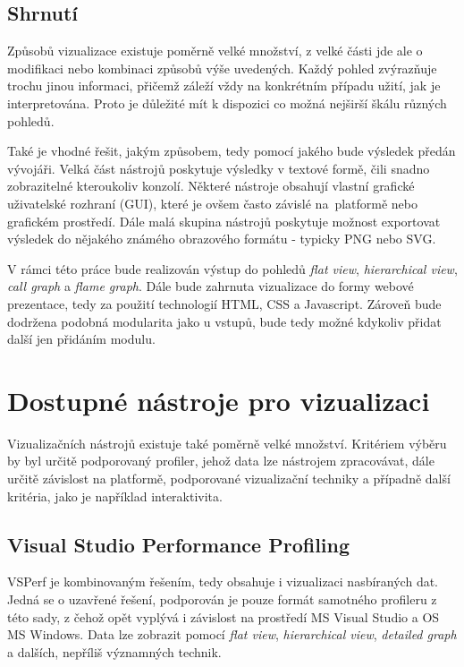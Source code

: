 \documentclass[czech,BP]{thesiskiv}
\begin{document}
\section{Shrnutí}

Způsobů vizualizace existuje poměrně velké množství, z velké části jde ale o modifikaci nebo kombinaci způsobů výše uvedených. Každý pohled zvýrazňuje trochu jinou informaci, přičemž záleží vždy na konkrétním případu užití, jak je interpretována. Proto je důležité mít k dispozici co možná nejširší škálu různých pohledů.

Také je vhodné řešit, jakým způsobem, tedy pomocí jakého  bude výsledek předán vývojáři. Velká část nástrojů poskytuje výsledky v textové formě, čili snadno zobrazitelné kteroukoliv konzolí. Některé nástroje obsahují vlastní grafické uživatelské rozhraní (GUI), které je ovšem často závislé na~platformě nebo grafickém prostředí. Dále malá skupina nástrojů poskytuje možnost exportovat výsledek do nějakého známého obrazového formátu - typicky PNG nebo SVG.

V rámci této práce bude realizován výstup do pohledů \emph{flat view}, \emph{hierarchical view}, \emph{call graph} a \emph{flame graph}. Dále bude zahrnuta vizualizace do formy webové prezentace, tedy za použití technologií HTML, CSS a Javascript. Zároveň bude dodržena podobná modularita jako u vstupů, bude tedy možné kdykoliv přidat další  jen přidáním modulu.


\newpage

\chapter{Dostupné nástroje pro vizualizaci}

Vizualizačních nástrojů existuje také poměrně velké množství. Kritériem výběru by byl určitě podporovaný profiler, jehož data lze nástrojem zpracovávat, dále určitě závislost na platformě, podporované vizualizační techniky a případně další kritéria, jako je například interaktivita.

\section{Visual Studio Performance Profiling}

VSPerf je kombinovaným řešením, tedy obsahuje i vizualizaci nasbíraných dat. Jedná se o uzavřené řešení, podporován je pouze formát samotného profileru z této sady, z čehož opět vyplývá i závislost na prostředí MS Visual Studio a OS MS Windows. Data lze zobrazit pomocí \emph{flat view}, \emph{hierarchical view}, \emph{detailed graph} a dalších, nepříliš významných technik.
\end{document}
